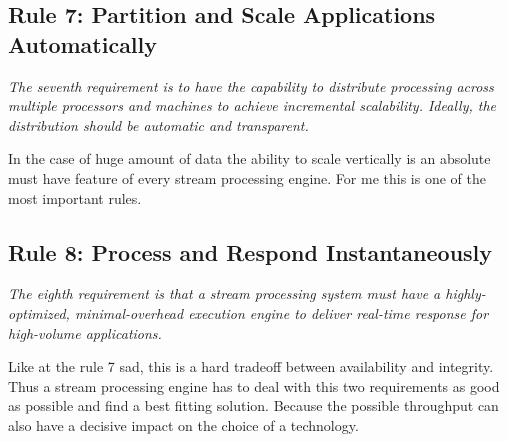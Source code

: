 \subsection{Rule 7: Partition and Scale Applications Automatically}
\textit{The seventh requirement is to have the capability to
        distribute processing across multiple processors and
        machines to achieve incremental scalability. Ideally, the
        distribution should be automatic and transparent.}

\medskip
In the case of huge amount of data the ability to scale vertically is an absolute must have feature of
every stream processing engine. For me this is one of the most important rules.

\subsection{Rule 8: Process and Respond Instantaneously}
\textit{The eighth requirement is that a stream processing system
must have a highly-optimized, minimal-overhead execution
engine to deliver real-time response for high-volume
applications.}

\medskip
Like at the rule 7 sad, this is a hard tradeoff between availability and integrity.
Thus a stream processing engine has to deal with this two requirements as good as possible
and find a best fitting solution.
Because the possible throughput can also have a decisive impact on the choice of a technology.




























